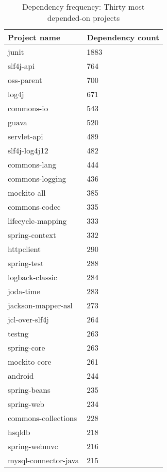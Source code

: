 \begin{table}
	\centering
	\begin{tabular}{ | l | l | }
	    \hline
	    \textbf{Project name} & \textbf{Dependency count} \\ \hline
	    junit & 1883 \\ \hline
	    slf4j-api & 764 \\ \hline	
	    oss-parent & 700 \\ \hline
	    log4j & 671 \\ \hline
	    commons-io & 543 \\ \hline
	    guava & 520 \\ \hline
	    servlet-api & 489 \\ \hline
	    slf4j-log4j12 & 482 \\ \hline
	    commons-lang & 444 \\ \hline
	    commons-logging & 436 \\ \hline
	    mockito-all & 385 \\ \hline
	    commons-codec & 335 \\ \hline
	    lifecycle-mapping & 333 \\ \hline
	    spring-context & 332 \\ \hline
	    httpclient & 290 \\ \hline
	    spring-test & 288 \\ \hline
	    logback-classic & 284 \\ \hline
	    joda-time & 283 \\ \hline
	    jackson-mapper-asl & 273 \\ \hline
	    jcl-over-slf4j & 264 \\ \hline
	    testng & 263 \\ \hline
	    spring-core & 263 \\ \hline
	    mockito-core & 261 \\ \hline
	    android & 244 \\ \hline
	    spring-beans & 235 \\ \hline
	    spring-web & 234 \\ \hline
	    commons-collections & 228 \\ \hline
	    hsqldb & 218 \\ \hline
	    spring-webmvc & 216 \\ \hline
	    mysql-connector-java & 215 \\ \hline
	\end{tabular}
	\caption{Dependency frequency: Thirty most depended-on projects}
	\label{table:dependency-frequency}
\end{table}
